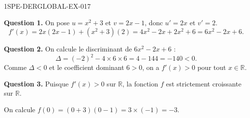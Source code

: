 \begin{corrige}{1SPE-DERGLOBAL-EX-017}

\textbf{Question 1.} On pose $u = x^2+3$ et $v = 2x-1$, donc $u' = 2x$ et $v' = 2$.
\[
f'(x) = 2x(2x-1) + (x^2+3)(2) = 4x^2-2x + 2x^2+6 = \boxed{6x^2-2x+6}.
\]

\textbf{Question 2.} On calcule le discriminant de $6x^2-2x+6$ :
\[
\Delta = (-2)^2 - 4 \times 6 \times 6 = 4 - 144 = -140 < 0.
\]
Comme $\Delta < 0$ et le coefficient dominant $6 > 0$, on a $f'(x) > 0$ pour tout $x \in \mathbb{R}$.

\textbf{Question 3.} Puisque $f'(x) > 0$ sur $\mathbb{R}$, la fonction $f$ est strictement croissante sur $\mathbb{R}$.

On calcule $f(0) = (0+3)(0-1) = 3 \times (-1) = -3$.
\end{corrige}
